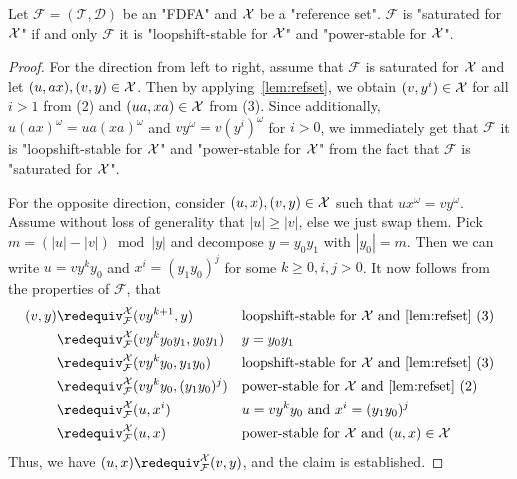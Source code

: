 \documentclass[a4paper,USenglish,cleveref,autoref,thm-restate]{lipics-v2021}
\newcommand{\mc}[1]{\ensuremath{\mathcal{#1}}}
\newcommand{\T}{\mc{T}}
\newcommand{\F}{\mc{F}}
\newcommand{\D}{\mc{D}}
\begin{document}
{\begin{lemma}
  Let $\F = (\T, \D)$ be an "FDFA" and $\mathcal{X}$ be a "reference set".
  $\F$ is "saturated for $\mathcal{X}$" if and only $\F$ it is
  "loopshift-stable for $\mathcal{X}$" and "power-stable for $\mathcal{X}$".\label{app:lemma:fdfacharacterisation}
\end{lemma}
\begin{proof}
  For the direction from left to right, assume that $\F$ is saturated for $\mathcal{X}$ and let $(u,ax), (v,y) \in \mathcal{X}$.
  Then by applying~\cref{lem:refset}, we obtain $(v,y^i) \in \mathcal{X}$ for all $i > 1$ from (2) and $(ua,xa)\in\mathcal{X}$ from (3).
  Since additionally, $u(ax)^\omega = ua(xa)^\omega$ and $vy^\omega = v(y^i)^\omega$ for $i > 0$, we  immediately get that $\F$ it is "loopshift-stable for $\mathcal{X}$" and "power-stable for $\mathcal{X}$" from the fact that $\F$ is "saturated for $\mathcal{X}$".

  For the opposite direction, consider $(u,x),(v,y) \in \mathcal{X}$ such that $ux^\omega = vy^\omega$.
  Assume without loss of generality that $|u| \geq |v|$, else we just swap them.
  Pick $m = (|u| - |v|) \bmod |y|$ and decompose $y = y_0y_1$ with $|y_0| = m$.
  Then we can write $u = vy^ky_0$ and $x^i = (y_1y_0)^j$ for some $k \geq 0, i, j > 0$.
  It now follows from the properties of $\F$, that 
  \begin{align*}
    (v,y) & \redequiv^\X_\F (vy^{k+1},y) & & \text{loopshift-stable for $\X$ and \cref{lem:refset}~(3)}\\
    & \redequiv^\X_\F  (vy^ky_0y_1, y_0y_1)    &  & \text{$y = y_0y_1$}                 \\
    & \redequiv^\X_\F  (vy^ky_0, y_1y_0)      &  & \text{loopshift-stable for $\X$ and \cref{lem:refset}~(3)} \\
    & \redequiv^\X_\F  (vy^ky_0, (y_1y_0)^j)  &  & \text{power-stable for $\X$ and \cref{lem:refset}~(2)} \\
    & \redequiv^\X_\F  (u, x^i) & & u =vy^ky_0 \text{ and } x^i = (y_1y_0)^j\\
    & \redequiv^\X_\F  (u, x)  &  & \text{power-stable for $\X$ and $(u,x) \in \X$}
  \end{align*}
  Thus, we have $(u,x) \redequiv^\X_\F (v,y)$, and the claim is established.
\end{proof}

}
\end{document}
